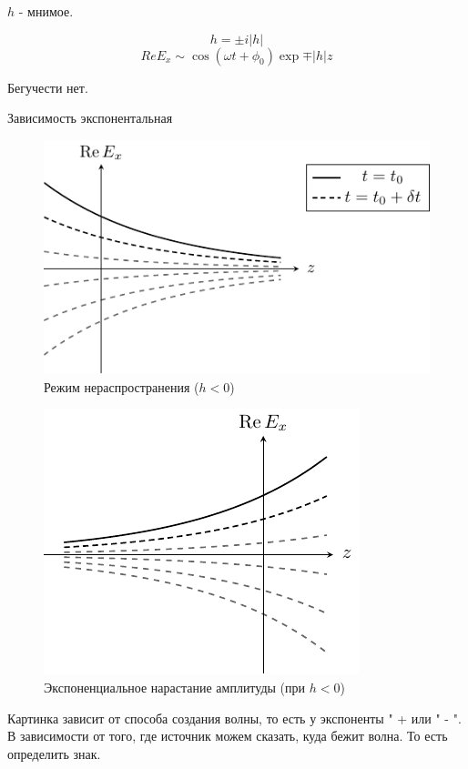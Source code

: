 $h$ - мнимое.

\begin{equation}
	h = \pm i |h|
\end{equation}
\begin{equation}
	Re{E_x} \sim \cos(\omega t + \phi_0) \exp{\mp |h| z}
\end{equation}

Бегучести нет.

Зависимость экспонентальная
\begin{figure}[H]
	\centering
	\includegraphics[scale=1.5]{img/lect3_ris2}
	\caption{Режим нераспространения ($h<0$)}
	\label{fig:lect3:2}
\end{figure}

\begin{figure}[H]
	\centering
	\includegraphics[scale=1.5]{img/lect3_ris3}
	\caption{Экспоненциальное нарастание амплитуды (при $h<0$)}
	\label{fig:lect3:3}
\end{figure}
Картинка зависит от способа создания волны, то есть у экспоненты " + или 		" - ". В зависимости от того, где источник можем сказать, куда бежит волна. То есть определить знак.

